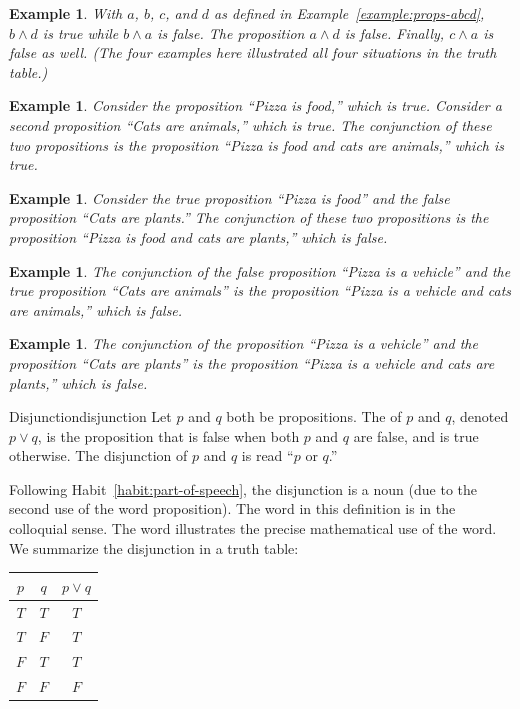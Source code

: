 \documentclass{book}
\newcounter{ekcounter}%
\theoremstyle{ekimcustom}
\newtheorem{example}[ekcounter]{Example}
\newcommand\defn[1]{{\color{blue}{\bf #1}}}
\begin{document}
\begin{example}
With $a$, $b$, $c$, and $d$ as defined in Example~\ref{example:props-abcd}, $b \wedge d$ is true while $b \wedge a$ is false. The proposition $a \wedge d$ is false. Finally, $c \wedge a$ is false as well. (The four examples here illustrated all four situations in the truth table.)
\end{example}
\begin{example}
Consider the proposition ``Pizza is food,'' which is true. Consider a second proposition ``Cats are animals,'' which is true. The conjunction of these two propositions is the proposition ``Pizza is food and cats are animals,'' which is true.
\end{example}
\begin{example}
Consider the true proposition ``Pizza is food'' and the false proposition ``Cats are plants.'' The conjunction of these two propositions is the proposition ``Pizza is food and cats are plants,'' which is false.
\end{example}
\begin{example}
The conjunction of the false proposition ``Pizza is a vehicle'' and the true proposition ``Cats are animals'' is the proposition ``Pizza is a vehicle and cats are animals,'' which is false.
\end{example}
\begin{example}
The conjunction of the proposition ``Pizza is a vehicle'' and the proposition ``Cats are plants'' is the proposition ``Pizza is a vehicle and cats are plants,'' which is false.
\end{example}

\begin{bdefinition}{Disjunction}{disjunction}
Let $p$ and $q$ both be propositions. The \defn{disjunction} of $p$ and $q$, denoted $p \vee q$, is the proposition that is false when both $p$ and $q$ are false, and is true otherwise. The disjunction of $p$ and $q$ is read ``$p$ or $q$.''
\end{bdefinition}
Following Habit~\ref{habit:part-of-speech}, the disjunction is a noun (due to the second use of the word proposition). The word  in this definition is in the colloquial sense. The word  illustrates the precise mathematical use of the word. We summarize the disjunction in a truth table:
\begin{center}
\begin{tabular}{c|c||c}
$p$ & $q$ & $p \vee q$ \\\hline
$T$ & $T$ & $T$\\
$T$ & $F$ & $T$\\
$F$ & $T$ & $T$\\
$F$ & $F$ & $F$
\end{tabular}
\end{center}
\end{document}

